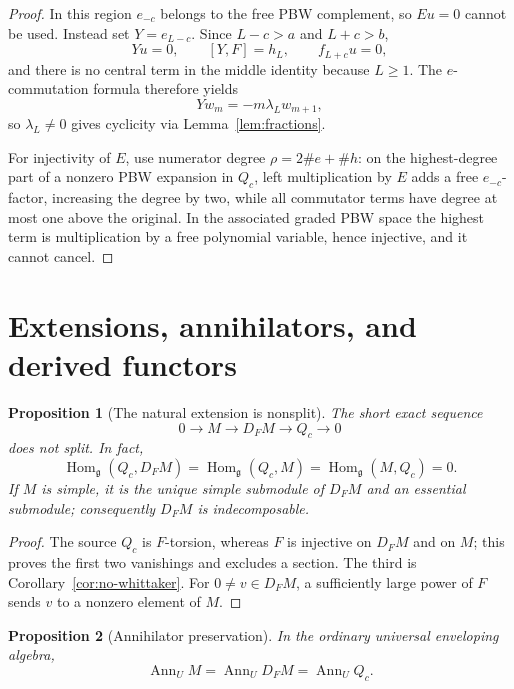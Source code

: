 \documentclass[11pt,a4paper]{article}
\newcommand{\g}{\mathfrak g}
\newcommand{\Ann}{\operatorname{Ann}}
\newcommand{\Hom}{\operatorname{Hom}}
\theoremstyle{plainupright}
\newtheorem{proposition}{Proposition}[section]
\begin{document}
\begin{proof}
In this region \(e_{-c}\) belongs to the free PBW complement, so \(Eu=0\)
cannot be used. Instead set \(Y=e_{L-c}\). Since \(L-c>a\) and \(L+c>b\),
\[
Yu=0,\qquad [Y,F]=h_L,\qquad f_{L+c}u=0,
\]
and there is no central term in the middle identity because \(L\ge1\). The
\(e\)-commutation formula therefore yields
\[
Yw_m=-m\lambda_Lw_{m+1},
\]
so \(\lambda_L\ne0\) gives cyclicity via Lemma~\ref{lem:fractions}.

For injectivity of \(E\), use numerator degree \(\rho=2\#e+\#h\): on the
highest-degree part of a nonzero PBW expansion in \(Q_c\), left multiplication
by \(E\) adds a free \(e_{-c}\)-factor, increasing the degree by two, while
all commutator terms have degree at most one above the original. In the
associated graded PBW space the highest term is multiplication by a free
polynomial variable, hence injective, and it cannot cancel.
\end{proof}

\section{Extensions, annihilators, and derived functors}\label{sec:homological}

\begin{proposition}[The natural extension is nonsplit]\label{prop:extension}
The short exact sequence
\[
0\longrightarrow M\longrightarrow D_FM\longrightarrow Q_c\longrightarrow0
\]
does not split. In fact,
\[
\Hom_\g(Q_c,D_FM)=\Hom_\g(Q_c,M)=\Hom_\g(M,Q_c)=0.
\]
If \(M\) is simple, it is the unique simple submodule of \(D_FM\) and an
essential submodule; consequently \(D_FM\) is indecomposable.
\end{proposition}

\begin{proof}
The source \(Q_c\) is \(F\)-torsion, whereas \(F\) is injective on \(D_FM\)
and on \(M\); this proves the first two vanishings and excludes a section.
The third is Corollary~\ref{cor:no-whittaker}. For \(0\ne v\in D_FM\), a
sufficiently large power of \(F\) sends \(v\) to a nonzero element of \(M\).
\end{proof}

\begin{proposition}[Annihilator preservation]\label{prop:ann}
In the ordinary universal enveloping algebra,
\[
\Ann_U M=\Ann_U D_FM=\Ann_U Q_c.
\]
\end{proposition}
\end{document}
